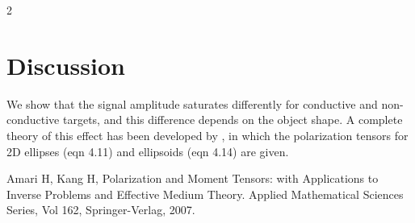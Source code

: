 \documentclass[10pt,a4paper]{article}
\renewenvironment{thebibliography}[1]{%
    \begin{oldthebibliography}{#1}%
      \setlength{\parskip}{0ex}%
      \setlength{\itemsep}{0ex}%
  }%
  {%
    \end{oldthebibliography}%
  }
\begin{document}
\begin{multicols}{2}
\section{Discussion}

We show that the signal amplitude saturates differently for 
conductive and non-conductive targets, and this difference
depends on the object shape. A complete theory of this
effect has been developed by \cite{amari2007}, in which 
the polarization tensors for 2D ellipses (eqn 4.11) and 
ellipsoids (eqn 4.14) are given.

\footnotesize
\begin{thebibliography}{}
Amari H, Kang H, 
Polarization and Moment Tensors: with Applications to
Inverse Problems and Effective Medium Theory. Applied Mathematical
Sciences Series, Vol 162, Springer-Verlag, 2007.
\end{thebibliography}
\end{multicols}
\end{document}
